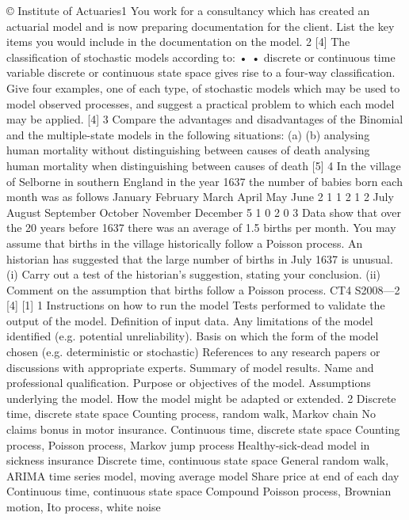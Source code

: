 \documentclass[a4paper,12pt]{article}
\begin{document}
\begin{enumerate}
© Institute of Actuaries1
You work for a consultancy which has created an actuarial model and is now
preparing documentation for the client.
List the key items you would include in the documentation on the model.
2
[4]
The classification of stochastic models according to:
•
•
discrete or continuous time variable
discrete or continuous state space
gives rise to a four-way classification.
Give four examples, one of each type, of stochastic models which may be used to
model observed processes, and suggest a practical problem to which each model may
be applied.
[4]
3
Compare the advantages and disadvantages of the Binomial and the multiple-state
models in the following situations:
(a)
(b)
analysing human mortality without distinguishing between causes of death
analysing human mortality when distinguishing between causes of death
[5]
4
In the village of Selborne in southern England in the year 1637 the number of babies
born each month was as follows
January
February
March
April
May
June
2
1
1
2
1
2
July
August
September
October
November
December
5
1
0
2
0
3
Data show that over the 20 years before 1637 there was an average of 1.5 births per
month. You may assume that births in the village historically follow a Poisson
process.
An historian has suggested that the large number of births in July 1637 is unusual.
(i) Carry out a test of the historian’s suggestion, stating your conclusion.
(ii) Comment on the assumption that births follow a Poisson process.
CT4 S2008—2
[4]
[1]
1
Instructions on how to run the model
Tests performed to validate the output of the model.
Definition of input data.
Any limitations of the model identified (e.g. potential unreliability).
Basis on which the form of the model chosen (e.g. deterministic or stochastic)
References to any research papers or discussions with appropriate experts.
Summary of model results.
Name and professional qualification.
Purpose or objectives of the model.
Assumptions underlying the model.
How the model might be adapted or extended.
2
Discrete time, discrete state space
Counting process, random walk, Markov chain
No claims bonus in motor insurance.
Continuous time, discrete state space
Counting process, Poisson process, Markov jump process
Healthy-sick-dead model in sickness insurance
Discrete time, continuous state space
General random walk, ARIMA time series model, moving average model
Share price at end of each day
Continuous time, continuous state space
Compound Poisson process, Brownian motion, Ito process, white noise

\end{enumerate}
\end{document}
